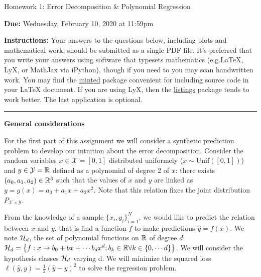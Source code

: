 \documentclass{article}
\newcommand{\bb}{b}
\newcommand{\ruleskip}{\bigskip\hrule\bigskip}
\begin{document}
\pagestyle{myheadings} 

\begin{center}
{\Large
Homework 1: Error Decomposition \& Polynomial Regression
} 
\end{center}

{
{ \color{nyupurple} \textbf{Due:} Wednesday, February 10, 2020 at 11:59pm} 
} 

\textbf{Instructions: }Your answers to the questions below, including plots and mathematical
 work, should be submitted as a single PDF file.  It's preferred that you write your answers using software that typesets mathematics (e.g.LaTeX, LyX, or MathJax via iPython), though if you need to you may scan handwritten work.  You may find the \href{https://github.com/gpoore/minted}{minted} package convenient for including source code in your LaTeX document.  If you are using LyX, then the \href{https://en.wikibooks.org/wiki/LaTeX/Source_Code_Listings}{listings} package tends to work better. The last application is optional.

 \ruleskip

\textbf{\color{nyupurple} General considerations}

For the first part of this assignment we will consider a synthetic prediction problem to develop our intuition about the error decomposition. Consider the random variables $x \in \mathcal{X} = [0,1]$ distributed uniformely ($ x \sim \mathrm{Unif}([0,1])$) and $y \in \mathcal{Y} = {\mathbb{R}}$ defined as a polynomial of degree 2 of $x$: there exists $(a_0, a_1, a_2) \in {\mathbb{R}}^3$ such that the values of $x$ and $y$ are linked as $y = g(x) = a_0 + a_1 x + a_2 x^2$. Note that this relation fixes the joint distribution $P_{\mathcal{X} \times \mathcal{Y}}$.

From the knowledge of a sample $\{x_i, y_i\}_{i=1}^N$, we would like to predict the relation between $x$ and $y$, that is find a function $f$ to make predictions $\hat{y} = f(x)$. We note ${\mathcal{H}}_d$, the set of polynomial functions on $\mathbb{R}$ of degree $d$: $\gH_d = \left\{f: x \rightarrow \bb_0 + \bb x + \cdots \bb_d x^d; \bb_k \in \sR \forall k\in \{0, \cdots d\} \right\}$. We will consider the hypothesis classes ${\mathcal{H}}_d$ varying d.
We will minimize the squared loss $\ell(\hat{y},y) = \frac 1 2 (\hat{y} - y)^2$ to solve the regression problem.
\end{document}
